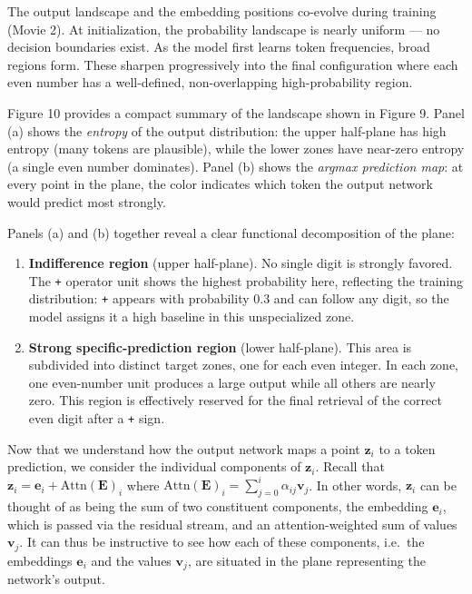 \documentclass[
  11pt,
  a4paper,
]{article}
\providecommand{\tightlist}{%
  \setlength{\itemsep}{0pt}\setlength{\parskip}{0pt}}
\renewcommand{\tightlist}{}
\begin{document}
The output landscape and the embedding positions co-evolve during
training (Movie 2). At initialization, the probability landscape is
nearly uniform --- no decision boundaries exist. As the model first
learns token frequencies, broad regions form. These sharpen
progressively into the final configuration where each even number has a
well-defined, non-overlapping high-probability region.

Figure 10 provides a compact summary of the landscape shown in Figure 9.
Panel (a) shows the \emph{entropy} of the output distribution: the upper
half-plane has high entropy (many tokens are plausible), while the lower
zones have near-zero entropy (a single even number dominates). Panel (b)
shows the \emph{argmax prediction map}: at every point in the plane, the
color indicates which token the output network would predict most
strongly.

Panels (a) and (b) together reveal a clear functional decomposition of
the plane:

\begin{enumerate}
\def\labelenumi{\arabic{enumi}.}
\tightlist
\item
  \textbf{Indifference region} (upper half-plane). No single digit is
  strongly favored. The \texttt{+} operator unit shows the highest
  probability here, reflecting the training distribution: \texttt{+}
  appears with probability 0.3 and can follow any digit, so the model
  assigns it a high baseline in this unspecialized zone.
\item
  \textbf{Strong specific-prediction region} (lower half-plane). This
  area is subdivided into distinct target zones, one for each even
  integer. In each zone, one even-number unit produces a large output
  while all others are nearly zero. This region is effectively reserved
  for the final retrieval of the correct even digit after a \texttt{+}
  sign.
\end{enumerate}

Now that we understand how the output network maps a point
\(\mathbf{z}_i\) to a token prediction, we consider the individual
components of \(\mathbf{z}_i\). Recall that
\(\mathbf{z}_i = \mathbf{e}_i + \mathrm{Attn}(\mathbf{E})_i\) where
\(\mathrm{Attn}(\mathbf{E})_i = \sum_{j=0}^{i} \alpha_{ij} \mathbf{v}_j\).
In other words, \(\mathbf{z}_i\) can be thought of as being the sum of
two constituent components, the embedding \(\mathbf{e}_i\), which is
passed via the residual stream, and an attention-weighted sum of values
\(\mathbf{v}_j\). It can thus be instructive to see how each of these
components, i.e.~the embeddings \(\mathbf{e}_i\) and the values
\(\mathbf{v}_j\), are situated in the plane representing the network's
output.
\end{document}
